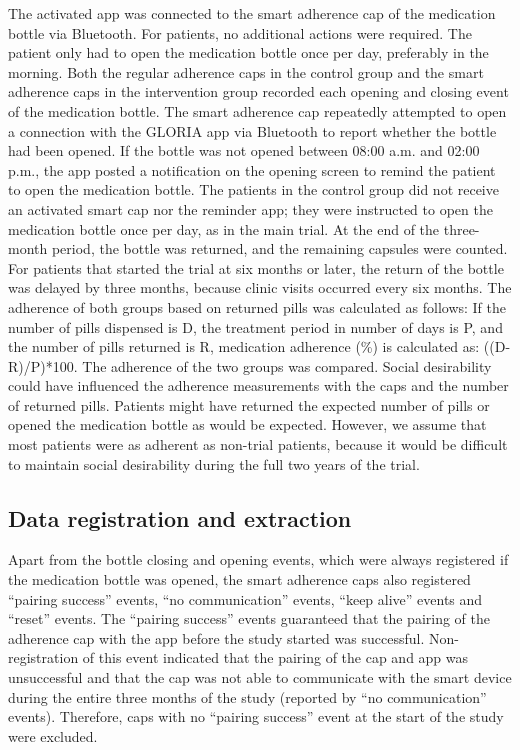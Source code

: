 \documentclass[twocolumn, serif, empirical, authordate]{jote-article}
\begin{document}
 The activated app was connected to the smart adherence cap of the medication bottle via Bluetooth. For patients, no additional actions were required. The patient only had to open the medication bottle once per day, preferably in the morning. Both the regular adherence caps in the control group and the smart adherence caps in the intervention group recorded each opening and closing event of the medication bottle. The smart adherence cap repeatedly attempted to open a connection with the GLORIA app via Bluetooth to report whether the bottle had been opened.
If the bottle was not opened between 08:00 a.m. and 02:00 p.m., the app posted a notification on the opening screen to remind the patient to open the medication bottle. The patients in the control group did not receive an activated smart cap nor the reminder app; they were instructed to open the medication bottle once per day, as in the main trial. At the end of the three-month period, the bottle was returned, and the remaining capsules were counted. For patients that started the trial at six months or later, the return of the bottle was delayed by three months, because clinic visits occurred every six months. The adherence of both groups based on returned pills was calculated as follows: If the number of pills dispensed is D, the treatment period in number of days is P, and the number of pills returned is R, medication adherence (\%) is calculated as: ((D-R)/P)*100. The adherence of the two groups was compared.
 Social desirability could have influenced the adherence measurements with the caps and the number of returned pills. Patients might have returned the expected number of pills or opened the medication bottle as would be expected. However, we assume that most patients were as adherent as non-trial patients, because it would be difficult to maintain social desirability during the full two years of the trial.


\subsection*{Data registration and extraction}

 Apart from the bottle closing and opening events, which were always registered if the medication bottle was opened, the smart adherence caps also registered ``pairing success'' events, ``no communication'' events, ``keep alive'' events and ``reset'' events.
 The ``pairing success'' events guaranteed that the pairing of the adherence cap with the app before the study started was successful.
Non-registration of this event indicated that the pairing of the cap and app was unsuccessful and that the cap was not able to communicate with the smart device during the entire three months of the study (reported by ``no communication'' events). Therefore, caps with no ``pairing success'' event at the start of the study were excluded.
\end{document}

